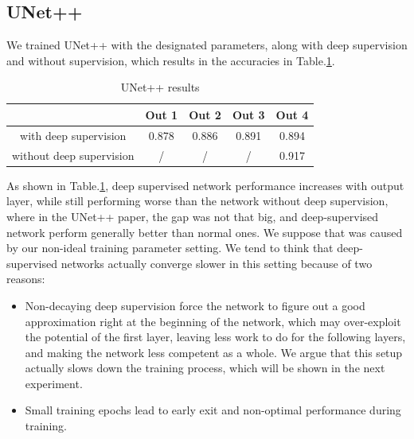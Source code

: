 \subsection{UNet++}
We trained UNet++ with the designated parameters, along with deep supervision and without supervision, which results in the accuracies in Table.\ref{tab:unetppResult}.

\begin{table}[!htbp]
\centering
\caption{UNet++ results}\label{tab:unetppResult}
\begin{tabular}{c|c|c|c|c}
\hline
& Out 1&Out 2&Out 3&Out 4\\    
\hline
with deep supervision & 0.878 & 0.886 & 0.891 & 0.894\\
without deep supervision & / & / & / & 0.917\\
\hline
\end{tabular}
\end{table}

As shown in Table.\ref{tab:unetppResult}, deep supervised network performance increases with output layer, while still performing worse than the network without deep supervision, where in the UNet++ paper\cite{unet_pp}, the gap was not that big, and deep-supervised network perform generally better than normal ones. We suppose that was caused by our non-ideal training parameter setting. We tend to think that deep-supervised networks actually converge slower in this setting because of two reasons:
\begin{itemize}
    \item Non-decaying deep supervision force the network to figure out a good approximation right at the beginning of the network, which may over-exploit the potential of the first layer, leaving less work to do for the following layers, and making the network less competent as a whole. We argue that this setup actually slows down the training process, which will be shown in the next experiment.
    \item Small training epochs lead to early exit and non-optimal performance during training.
\end{itemize}

